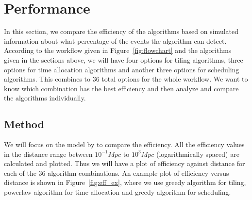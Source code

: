 \documentclass[twocolumn]{aastex61}
\begin{document}
\section{Performance}
\label{sec:performance}
In this section, we compare the efficiency of the algorithms based on simulated information about what percentage of the events the algorithm can detect. According to the workflow given in Figure~\ref{fig:flowchart} and the algorithms given in the sections above, we will have four options for tiling algorithms, three options for time allocation algorithms and another three options for scheduling algorithms. This combines to 36 total options for the whole workflow. We want to know which combination has the best efficiency and then analyze and compare the algorithms individually.
\subsection{Method}
We will focus on the model by \cite{Me2017} to compare the efficiency. All the efficiency values in the distance range between $10^{-1} Mpc$ to $10^3 Mpc$ (logarithmically spaced) are calculated and plotted. Thus we will have a plot of efficiency against distance for each of the 36 algorithm combinations. An example plot of efficiency versus distance is shown in Figure~\ref{fig:eff_ex}, where we use greedy algorithm for tiling, powerlaw algorithm for time allocation and greedy algorithm for scheduling.
\end{document}
